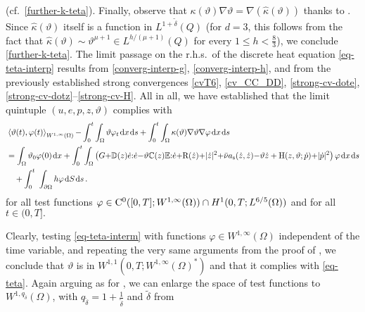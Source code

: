 \documentclass[a4paper,10pt,reqno]{amsart}
\numberwithin{equation}{section}
\numberwithin{equation}{section}
\def\dd{\;\!\mathrm{d}} %
\newcommand{\pairing}[4]{ \sideset{_{ #1 }}{_{ #2 }}  {\mathop{\langle #3 , #4
\rangle}}}
\newcommand{\teta}{\vartheta}
\newcommand{\bbC}{\mathbb{C}}
\newcommand{\bbD}{\mathbb{D}}
\newcommand{\bbE}{\mathbb{E}}
\newcommand{\condu}{\kappa}
\newcommand{\dip}[3]{\mathrm{H}(#1,#2;#3)}
\newcommand{\did}[1]{\mathrm{R}(#1)}
\newcommand{\ass}{a_{\mathrm{s}}}
\newcommand{\EEE}{\color{black}}
\begin{document}
    (cf.\ \eqref{further-k-teta}).
   Finally, observe that $\condu(\teta) \nabla \teta = \nabla (\hat{\condu}(\teta))$
      thanks to \cite{Marcus-Mizel}.  Since $\hat{\condu}(\teta)$
       itself is a function in $L^{1+\tilde\delta}(Q) $ (for $d=3$, this follows from the fact that $\hat{\condu}(\teta) \sim \teta^{\mu+1} \in L^{h/(\mu+1)}(Q)$ for  every $1 \leq h<\frac83$), we conclude \eqref{further-k-teta}.
 The limit passage on the r.h.s.\ of  the discrete heat equation \eqref{eq-teta-interp} results from   \eqref{converg-interp-g}, 
 \eqref{converg-interp-h}, 
 and from  the previously established strong convergences  \eqref{cvT6},  \eqref{cv_CC_DD},  \eqref{strong-cv-dote},   
 \eqref{strong-cv-dotz}--\eqref{strong-cv-H}. 
 All in all, we have established that the  limit quintuple $(u,e,p,z,\teta)$ complies
  with 
   \begin{equation}
\begin{aligned}
\label{eq-teta-interm}   &
\pairing{}{W^{1,\infty}(\Omega)}{\teta(t)}{\varphi(t)}
-\int_0^t\int_\Omega \teta \varphi_t \dd x \dd s     +\int_0^t \int_\Omega \condu(\teta) \nabla \teta\nabla\varphi \dd
x \dd s  
\\ &= \int_\Omega \teta_0 \varphi(0) \dd x  +
\int_0^t\int_\Omega \left(G{+} \bbD(z) \dot{e} {:} \dot{e}  
{-}\teta \bbC(z) \bbE {:}\dot e {+} \did{\dot z} {+} |\dot z|^2 {+} \bar \nu \ass (\dot{z}, \dot{z}) {-}\teta \dot{z} + \dip{z}{\teta}{\dot{p}} {+} |\dot{p}|^2 \right) 
\varphi \dd x \dd s
\\
&
\quad  
  +  \int_0^t \ \int_{\partial\Omega} h \varphi \dd S \dd s\,.
\end{aligned}
\end{equation}
for all   test functions
 $
\varphi\in {\mathrm C}^0([0,T]; W^{1,\infty}(\Omega))\cap
H^1(0,T;L^{6/5}(\Omega))  $
  and for all  $ t\in (0,T]. $
\par
Clearly, testing  \eqref{eq-teta-interm}  with functions $\varphi \in W^{1,\infty}(\Omega)$ independent of the time variable,
and repeating the very same arguments from the proof of \cite[Thm.\ 2]{Rossi2016}, we conclude that $\teta $ is in
$W^{1,1}(0,T;W^{1,\infty}(\Omega)^*)$ and that it complies with \eqref{eq-teta}. 
Again arguing as for  \cite[Thm.\ 2]{Rossi2016},
we can enlarge the space of test functions to $W^{1,q_{\tilde \delta}}(\Omega)$, with $q_{\tilde\delta} = 1+\tfrac1{\tilde\delta}$ and $\tilde \delta $ from 
\end{document}
